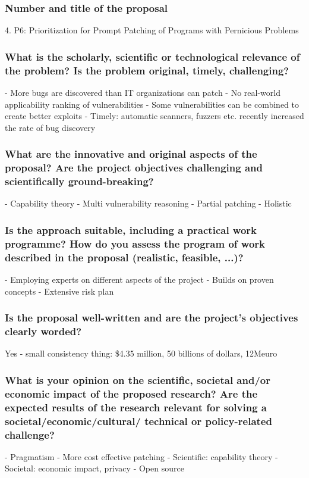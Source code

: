 \subsubsection*{Number and title of the proposal}
4. P6: Prioritization for Prompt Patching of Programs with Pernicious Problems

\subsubsection*{What is the scholarly, scientific or technological relevance of the problem? Is the problem original, timely, challenging?}
- More bugs are discovered than IT organizations can patch
- No real-world applicability ranking of vulnerabilities
- Some vulnerabilities can be combined to create better exploits
- Timely: automatic scanners, fuzzers etc. recently increased the rate of bug discovery

\subsubsection*{What are the innovative and original aspects of the proposal? Are the project objectives challenging and scientifically ground-breaking?}
- Capability theory
- Multi vulnerability reasoning
- Partial patching
- Holistic

\subsubsection*{Is the approach suitable, including a practical work programme? How do you assess the program of work described in the proposal (realistic, feasible, ...)?}
- Employing experts on different aspects of the project
- Builds on proven concepts
- Extensive risk plan

\subsubsection*{Is the proposal well-written and are the project’s objectives clearly worded?}
Yes
- small consistency thing: \$4.35 million, 50 billions of dollars, 12Meuro

\subsubsection*{What is your opinion on the scientific, societal and/or economic impact of the proposed research? Are the expected results of the research relevant for solving a societal/economic/cultural/ technical or policy-related challenge?}
- Pragmatism
- More cost effective patching
- Scientific: capability theory
- Societal: economic impact, privacy
- Open source

